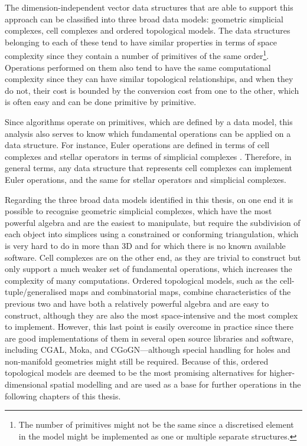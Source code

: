 The dimension-independent vector data structures that are able to support this approach can be classified into three broad data models: geometric simplicial complexes, cell complexes and ordered topological models.
The data structures belonging to each of these tend to have similar properties in terms of space complexity since they contain a number of primitives of the same order\footnote{The number of primitives might not be the same since a discretised element in the model might be implemented as one or multiple separate structures.}.
Operations performed on them also tend to have the same computational complexity since they can have similar topological relationships, and when they do not, their cost is bounded by the conversion cost from one to the other, which is often easy and can be done primitive by primitive.

Since algorithms operate on primitives, which are defined by a data model, this analysis also serves to know which fundamental operations can be applied on a data structure.
For instance, Euler operations are defined in terms of cell complexes \citep{Mantyla88} and stellar operators in terms of simplicial complexes \citep{Velho03}.
Therefore, in general terms, any data structure that represents cell complexes can implement Euler operations, and the same for stellar operators and simplicial complexes.

Regarding the three broad data models identified in this thesis, on one end it is possible to recognise geometric simplicial complexes, which have the most powerful algebra and are the easiest to manipulate, but require the subdivision of each object into simplices using a constrained or conforming triangulation, which is very hard to do in more than 3D and for which there is no known available software.
Cell complexes are on the other end, as they are trivial to construct but only support a much weaker set of fundamental operations, which increases the complexity of many computations.
Ordered topological models, such as the cell-tuple/generalised maps and combinatorial maps, combine characteristics of the previous two and have both a relatively powerful algebra and are easy to construct, although they are also the most space-intensive and the most complex to implement.
However, this last point is easily overcome in practice since there are good implementations of them in several open source libraries and software, including CGAL, Moka, and CGoGN---although special handling for holes and non-manifold geometries might still be required.\@
Because of this, ordered topological models are deemed to be the most promising alternatives for higher-dimensional spatial modelling and are used as a base for further operations in the following chapters of this thesis.

